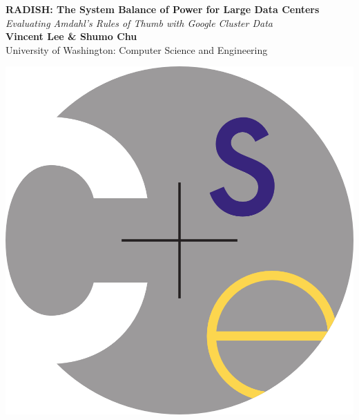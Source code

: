 \documentclass[a0,portrait]{a0poster}
\begin{document}


\begin{minipage}[b]{0.75\linewidth}
\veryHuge \color{NavyBlue} \textbf{RADISH: The System Balance of Power for Large Data Centers} \color{Black}\\ %
\Huge\textit{Evaluating Amdahl's Rules of Thumb with Google Cluster Data}\\[2cm] %
\huge \textbf{Vincent Lee \& Shumo Chu}\\[0.5cm] %
\huge University of Washington: Computer Science and Engineering\\[0.4cm] %
\end{minipage}
%
\begin{minipage}[b]{0.25\linewidth}
\includegraphics[width=20cm]{cse_logo.png}\\
\end{minipage}
\end{document}
